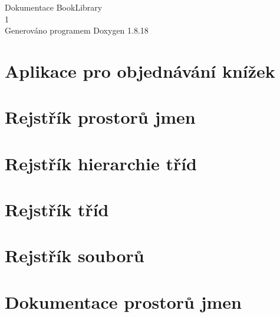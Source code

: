 \let\mypdfximage\pdfximage\def\pdfximage{\immediate\mypdfximage}\documentclass[twoside]{book}
\newcommand{\+}{\discretionary{\mbox{\scriptsize$\hookleftarrow$}}{}{}}
\newcommand{\clearemptydoublepage}{%
  \newpage{\pagestyle{empty}\cleardoublepage}%
}
\begin{document}
\hypersetup{pageanchor=false,
             bookmarksnumbered=true,
             pdfencoding=unicode
            }
\begin{titlepage}
\vspace*{7cm}
\begin{center}%
{\Large Dokumentace Book\+Library \\[1ex]\large 1 }\\
\vspace*{1cm}
{\large Generováno programem Doxygen 1.8.18}\\
\end{center}
\end{titlepage}
\clearemptydoublepage
{}
\tableofcontents
\clearemptydoublepage
{}
\hypersetup{pageanchor=true}

\chapter{Aplikace pro objednávání knížek}
\label{index}\hypertarget{index}{}
\chapter{Rejstřík prostorů jmen}

\chapter{Rejstřík hierarchie tříd}

\chapter{Rejstřík tříd}

\chapter{Rejstřík souborů}

\chapter{Dokumentace prostorů jmen}







\end{document}
